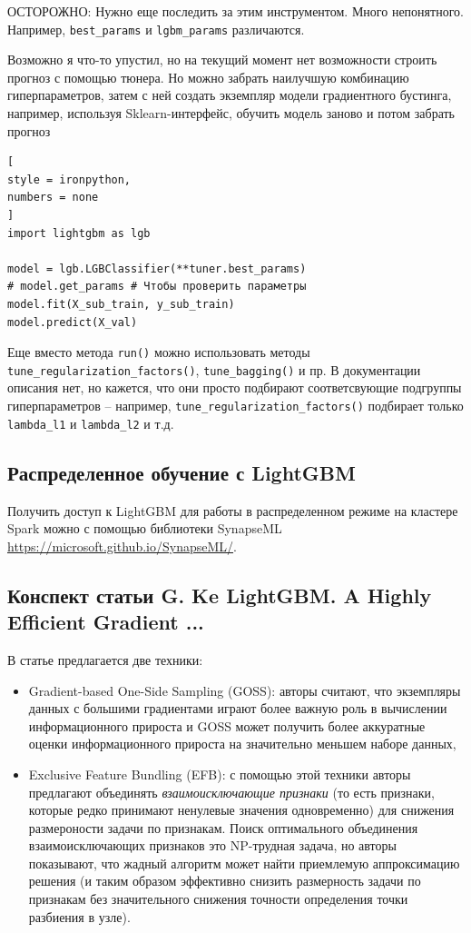 \documentclass[%
	11pt,
	a4paper,
	utf8,
		]{article}
\begin{document}
ОСТОРОЖНО: Нужно еще последить за этим инструментом. Много непонятного. Например, \verb|best_params| и \verb|lgbm_params| различаются.

Возможно я что-то упустил, но на текущий момент нет возможности строить прогноз с помощью тюнера. Но можно забрать наилучшую комбинацию гиперпараметров, затем с ней создать экземпляр модели градиентного бустинга, например, используя Sklearn-интерфейс, обучить модель заново и потом забрать прогноз
\begin{lstlisting}[
style = ironpython,
numbers = none
]
import lightgbm as lgb

model = lgb.LGBClassifier(**tuner.best_params)
# model.get_params # Чтобы проверить параметры
model.fit(X_sub_train, y_sub_train)
model.predict(X_val)
\end{lstlisting}

Еще вместо метода \verb|run()| можно использовать методы \verb|tune_regularization_factors()|, \verb|tune_bagging()| и пр. В документации описания нет, но кажется, что они просто подбирают соответсвующие подгруппы гиперпараметров -- например, \verb|tune_regularization_factors()| подбирает только \verb|lambda_l1| и \verb|lambda_l2| и т.д.


\subsection{Распределенное обучение с LightGBM}

Получить доступ к LightGBM для работы в распределенном режиме на кластере Spark можно с помощью библиотеки SynapseML \url{https://microsoft.github.io/SynapseML/}.

\subsection{Конспект статьи G. Ke LightGBM. A Highly Efficient Gradient ...}

В статье предлагается две техники:
\begin{itemize}
	\item Gradient-based One-Side Sampling (GOSS): авторы считают, что экземпляры данных с большими градиентами играют более важную роль в вычислении информационного прироста и GOSS может получить более аккуратные оценки информационного прироста на значительно меньшем наборе данных,
	
	\item Exclusive Feature Bundling (EFB): с помощью этой техники авторы предлагают объединять \emph{взаимоисключающие признаки} (то есть признаки, которые редко принимают ненулевые значения одновременно) для снижения размероности задачи по признакам. Поиск оптимального объединения взаимоисключающих признаков это NP-трудная задача, но авторы показывают, что жадный алгоритм может найти приемлемую аппроксимацию решения (и таким образом эффективно снизить размерность задачи по признакам без значительного снижения точности определения точки разбиения в узле).
\end{itemize}
\end{document}
